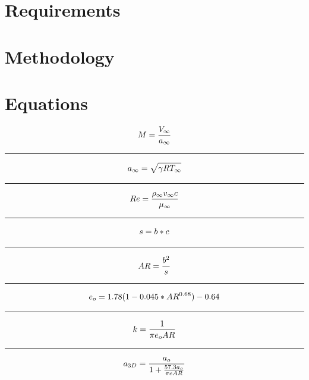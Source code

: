 \documentclass[12pt,A4paper]{article}
\begin{document}
	\clearpage
	\section{Requirements}
	\indent 

	\clearpage
	\section{Methodology}
	\indent 

	\clearpage
	\section{Equations}
		\begin{equation} \label{eq1} 
			M = \frac{V_\infty }{a_\infty} \\ 
		\end{equation}
		\hrule
		\vspace{0.1 in}
		\begin{equation}
			a_\infty = \sqrt{\gamma R T_\infty} \\
		\end{equation}
		\hrule
		\vspace{0.1 in}
		\begin{equation}
			Re = \frac{\rho_\infty v_\infty c}{\mu_\infty} \\
		\end{equation}
		\hrule
		\vspace{0.1 in}
		\begin{equation}
			s = b * c \\
		\end{equation}
		\hrule
		\vspace{0.1 in}
		\begin{equation}
			AR = \frac{b^2}{s} \\
		\end{equation}
		\hrule
		\vspace{0.1 in}
		\begin{equation}
			e_o = 1.78(1 - 0.045*AR^{0.68}) - 0.64 \\
		\end{equation}
		\hrule
		\vspace{0.1 in}
		\begin{equation}
			k = \frac{1}{\pi e_o AR} \\
		\end{equation}
		\hrule
		\vspace{0.1 in}
		\begin{equation}
			a_{3D} = \frac{a_o}{1 + \frac{57.3 a_o}{\pi e AR}} \\
		\end{equation}
\end{document}
